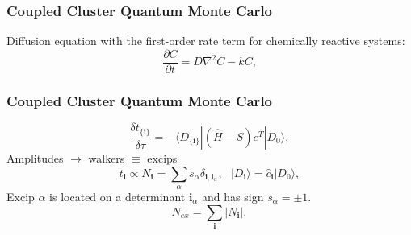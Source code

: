 \documentclass{beamer}
\begin{document}
\begin{frame}
\frametitle{Coupled Cluster Quantum Monte Carlo}
Diffusion equation with the first-order rate term for chemically reactive systems:
\begin{equation*}
\frac{\partial C}{\partial t} = D\nabla^2 C - kC,
\end{equation*}
\uncover<2->{\begin{equation*}
	-\frac{\partial}{\partial \tau} |\Psi(\tau)\rangle= (\only<2>{\frac{1}{2}\nabla^2}  - \only<2>{(\hat{V} -E_0)}) |\Psi(\tau)\rangle,
	\end{equation*}}
\end{frame}


\begin{frame}
\frametitle{Coupled Cluster Quantum Monte Carlo}
\begin{equation*}	
\frac{\delta t_{\{\boldsymbol{i}\}}}{\delta\tau} = -\langle D_{\{\boldsymbol{i}\}}|(\hat{H}-S)e^{\hat{T}}|D_0\rangle,
\end{equation*}
Amplitudes $\rightarrow$ walkers $\equiv$ {\color{red}excips}
\begin{equation*}	
t_{\boldsymbol{i}} \propto N_{\boldsymbol{i}} = \sum_\alpha s_\alpha \delta_{{\boldsymbol{i}},{\boldsymbol{i}}_\alpha} ,\ \ \ |D_{\boldsymbol{i}}\rangle = \hat{c}_{\boldsymbol{i}}|D_0\rangle,
\end{equation*}
Excip $\alpha$ is located on a determinant ${\boldsymbol{i}}_\alpha$ and has sign $s_\alpha = \pm 1$.
\begin{equation*}	
N_{ex} = \sum_{\boldsymbol{i}} |N_{\boldsymbol{i}}|, 
\end{equation*}
\end{frame}
\end{document}
